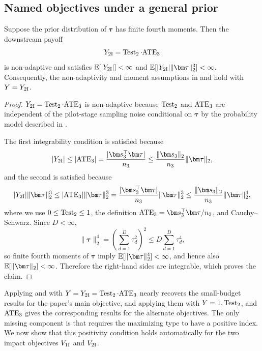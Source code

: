 \subsection{Named objectives under a general prior}
\label{sec:named-first-stage-results-appendix}

\begin{proposition}
  \label{prop:fourth-moment-small-investment-two-impact-appendix}
  Suppose the prior distribution of $\bm\tau$ has finite fourth moments.
  Then the downstream payoff
  \[
    Y_{\mathrm{2I}}=\operatorname{Test}_2\cdot \mathrm{ATE}_3
  \]
  is non-adaptive and satisfies $\mathbb{E}[|Y_{\mathrm{2I}}|]<\infty$ and $\E[|Y_{\twoimpact}|\|\bm\tau\|_2^3]<\infty$.
  Consequently, the non-adaptivity and moment assumptions in  and  hold with $Y=Y_{\mathrm{2I}}$.
\end{proposition}

\begin{proof}
  $Y_{\mathrm{2I}}=\operatorname{Test}_2\cdot \mathrm{ATE}_3$ is non-adaptive because $\operatorname{Test}_2$ and $\mathrm{ATE}_3$ are independent of the pilot-stage sampling noise conditional on $\bm\tau$ by the probability model described in .

  The first integrability condition is satisfied because
  \[
    |Y_{\twoimpact}|
    \le
    |\ATE_3|
    =
    \frac{|\bm s_3^\top\bm\tau|}{n_3}
    \le
    \frac{\|\bm s_3\|_2}{n_3}\|\bm\tau\|_2,
  \]
  and the second is satisfied because
  \[
    |Y_{\twoimpact}|\|\bm\tau\|_2^3
    \le
    |\ATE_3|\|\bm\tau\|_2^3
    =
    \frac{|\bm s_3^\top\bm\tau|}{n_3}\|\bm\tau\|_2^3
    \le
    \frac{\|\bm s_3\|_2}{n_3}\|\bm\tau\|_2^4,
  \]
  where we use $0\le\operatorname{Test}_2\le1$, the definition
  $\ATE_3=\bm s_3^\top\bm\tau/n_3$, and Cauchy--Schwarz.
  Since $D<\infty$,
  \[
    \|\bm\tau\|_2^4
    =
    \left(\sum_{d=1}^D \tau_d^2\right)^2
    \le
    D\sum_{d=1}^D \tau_d^4,
  \]
  so finite fourth moments of $\bm\tau$ imply $\E[\|\bm\tau\|_2^4]<\infty$, and hence also $\E[\|\bm\tau\|_2]<\infty$.
  Therefore the right-hand sides are integrable, which proves the claim.
\end{proof}

Applying  and  with $Y=Y_{\mathrm{2I}}=\operatorname{Test}_2 \cdot \mathrm{ATE}_3$ nearly recovers the small-budget results for the paper's main objective, and applying them with $Y=1, \operatorname{Test}_2$, and $\mathrm{ATE}_3$ gives the corresponding results for the alternate objectives.
The only missing component is that  requires the maximizing type to have a positive index.
We now show that this positivity condition holds automatically for the two impact objectives $V_{\mathrm{1I}}$ and $V_{\mathrm{2I}}$.

